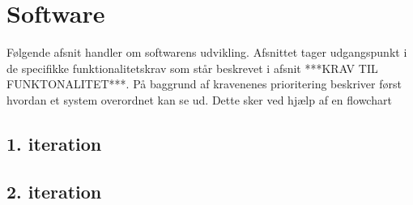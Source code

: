 \chapter{Software}
\label{software}
Følgende afsnit handler om softwarens udvikling. Afsnittet tager udgangspunkt i de specifikke funktionalitetskrav som står beskrevet i afsnit ***KRAV TIL FUNKTONALITET***. På baggrund af kravenenes prioritering beskriver først hvordan et system overordnet kan se ud. Dette sker ved hjælp af en flowchart  

\section{1. iteration}

\section{2. iteration}
